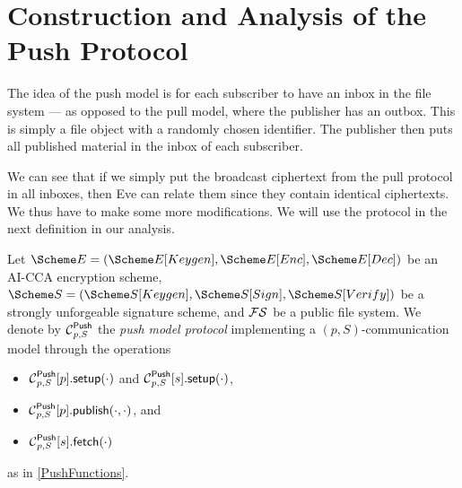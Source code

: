 \section{Construction and Analysis of the Push Protocol}
\label{PushAnalysis}

The idea of the push model is for each subscriber to have an inbox in the file 
system --- as opposed to the pull model, where the publisher has an outbox.
This is simply a file object with a randomly chosen identifier.
The publisher then puts all published material in the inbox of each subscriber.

We can see that if we simply put the broadcast ciphertext from the pull 
protocol in all inboxes, then Eve can relate them since they contain identical 
ciphertexts.
We thus have to make some more modifications.
We will use the protocol in the next definition in our analysis.

\begin{definition}\label{PushModel}
  Let \(\E = (\E[Keygen], \E[Enc], \E[Dec])\) be an AI-CCA encryption scheme,
  \(\S = (\S[Keygen], \S[Sign], \S[Verify])\) be a strongly unforgeable 
  signature scheme,
  and \(\operatorname{\mathcal{FS}}\) be a public file system.
  We denote by \(\Push[p, S]\) the \emph{push model protocol} implementing 
  a \((p, S)\)-communication model through the operations
  \begin{itemize}
    \item \(\pnsetup[p, S]{p}[\cdot]\) and \(\pnsetup[p, S]{s}[\cdot]\),
    \item \(\pnpub[p, S]{p}[\cdot][\cdot]\), and
    \item \(\pnget[p, S]{s}[\cdot]\)
  \end{itemize}
  as in \cref{PushFunctions}.
\end{definition}


